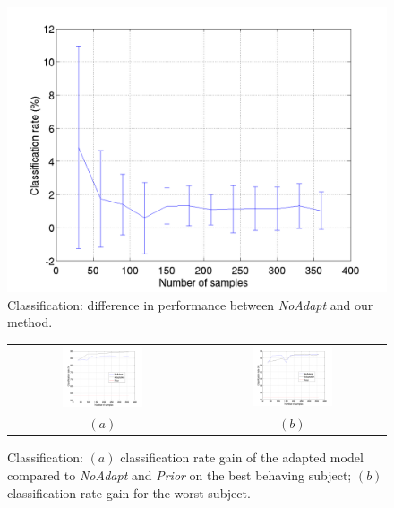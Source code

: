 \begin{figure}[t]
  \centering
  \includegraphics[width=0.95\linewidth]{figs/exp1}
  \caption{Classification: difference in performance between
    \emph{NoAdapt} and our method.}
  \label{fig:diff_cla}
\end{figure}

\begin{figure}[ht] \centering
  \begin{tabular}{cc}
    \includegraphics[width=0.45\textwidth]{figs/exp1_abs_best} &
    \includegraphics[width=0.45\textwidth]{figs/exp1_abs_worst} \\
    $(a)$ & $(b)$ \\
  \end{tabular}
  \caption{Classification: $(a)$ classification rate gain
    of the adapted model compared to \emph{NoAdapt} and \emph{Prior}
    on the best behaving subject; $(b)$ classification rate gain for
    the worst subject.}
  \label{fig:cla_abs}
\end{figure}

